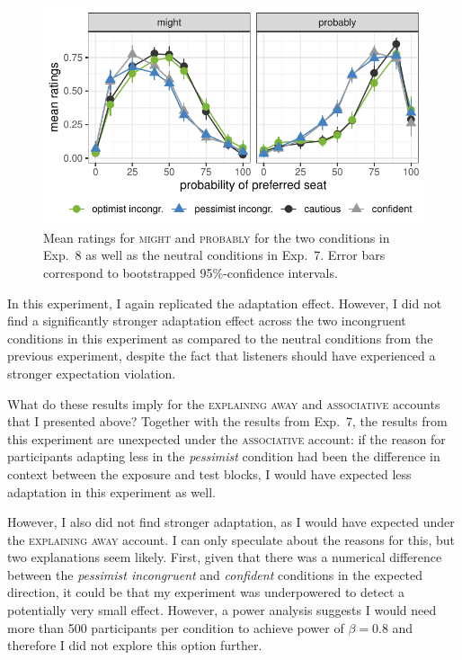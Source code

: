 \begin{figure}[t]
    \centering
    \includegraphics[width=.75\columnwidth, trim={0 0.75cm 0 0cm}]{./plots/incongruent.pdf}
    \caption{Mean ratings for \textsc{might} and \textsc{probably} for the two conditions in Exp.~8 as well as the neutral conditions in Exp.~7. Error bars correspond to bootstrapped 95\%-confidence intervals.}
    \label{fig:results-exp8}
\end{figure}

In this experiment, I again replicated the adaptation effect. However, I did not find a significantly stronger adaptation effect across the two incongruent conditions in this experiment as compared to the neutral conditions from the previous experiment, despite the fact that listeners should have experienced a stronger expectation violation.

What do these results imply for the \textsc{explaining away} and \textsc{associative} accounts that I presented above? Together with the results from Exp.~7, the results from this experiment are unexpected under the \textsc{associative} account: if the reason for participants adapting less in the \textit{pessimist} condition had been the difference in context between the exposure and test blocks, I would have expected less adaptation in this experiment as well.

However, I also did not find stronger adaptation, as I would have expected under the \textsc{explaining away} account. I can only speculate about the reasons for this, but two explanations seem likely. First, given that there was a numerical difference between the \textit{pessimist incongruent} and \textit{confident} conditions in the expected direction, it could be that my experiment was underpowered to detect a potentially very small effect. However, a power analysis suggests I would need more than 500 participants per condition to achieve power of $\beta=0.8$ and therefore I did not explore this option further.

